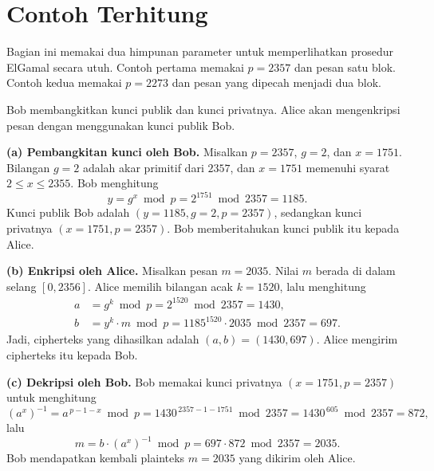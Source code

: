 \section{Contoh Terhitung}
\label{sec:contoh-elgamal}

Bagian ini memakai dua himpunan parameter untuk memperlihatkan prosedur
ElGamal secara utuh. Contoh pertama memakai $p = 2357$ dan pesan satu blok.
Contoh kedua memakai $p = 2273$ dan pesan yang dipecah menjadi dua blok.

\begin{example}[Pembangkitan kunci, enkripsi, dan dekripsi dengan $p = 2357$]
\label{ex:elgamal-2357}
Bob membangkitkan kunci publik dan kunci privatnya. Alice akan mengenkripsi
pesan dengan menggunakan kunci publik Bob.

\textbf{(a) Pembangkitan kunci oleh Bob.} Misalkan $p = 2357$, $g = 2$, dan
$x = 1751$. Bilangan $g = 2$ adalah akar primitif dari $2357$, dan $x = 1751$
memenuhi syarat $2 \le x \le 2355$. Bob menghitung
\[ y = g^{x} \bmod p = 2^{1751} \bmod 2357 = 1185 . \]
Kunci publik Bob adalah $(y = 1185, g = 2, p = 2357)$, sedangkan kunci
privatnya $(x = 1751, p = 2357)$. Bob memberitahukan kunci publik itu kepada
Alice.

\textbf{(b) Enkripsi oleh Alice.} Misalkan pesan $m = 2035$. Nilai $m$ berada
di dalam selang $[0, 2356]$. Alice memilih bilangan acak $k = 1520$, lalu
menghitung
\begin{align*}
a &= g^{k} \bmod p = 2^{1520} \bmod 2357 = 1430, \\
b &= y^{k} \cdot m \bmod p = 1185^{1520} \cdot 2035 \bmod 2357 = 697 .
\end{align*}
Jadi, cipherteks yang dihasilkan adalah $(a, b) = (1430, 697)$. Alice
mengirim cipherteks itu kepada Bob.

\textbf{(c) Dekripsi oleh Bob.} Bob memakai kunci privatnya $(x = 1751,
p = 2357)$ untuk menghitung
\[
\left(a^{x}\right)^{-1} = a^{\,p-1-x} \bmod p
= 1430^{\,2357-1-1751} \bmod 2357
= 1430^{\,605} \bmod 2357 = 872 ,
\]
lalu
\[
m = b \cdot \left(a^{x}\right)^{-1} \bmod p
= 697 \cdot 872 \bmod 2357 = 2035 .
\]
Bob mendapatkan kembali plainteks $m = 2035$ yang dikirim oleh Alice.
\end{example}


